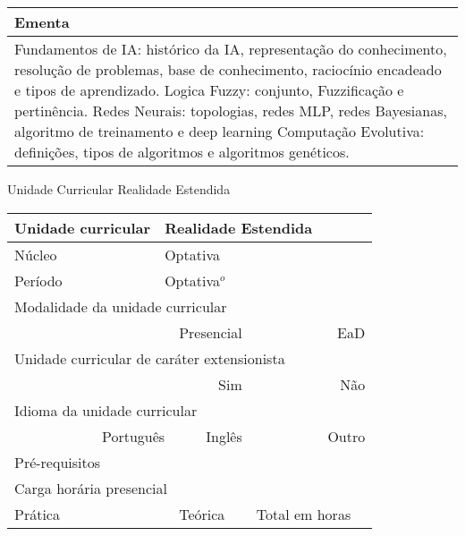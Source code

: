 \begin{quadro}[ht!]
\begin{tabular}{|p{3cm} p{2cm} p{3cm} p{2cm} p{3cm} p{2cm}|}
\multicolumn{6}{|p{15cm}|}{\cellcolor{blue1} Ementa} \\\hline
\hline\multicolumn{6}{|p{15cm}|}{\scriptsize Fundamentos de IA: histórico da IA, representação do conhecimento, resolução de problemas, base de conhecimento, raciocínio encadeado e tipos de aprendizado. Logica Fuzzy: conjunto, Fuzzificação e pertinência. Redes Neurais: topologias, redes MLP, redes Bayesianas, algoritmo de treinamento e deep learning Computação Evolutiva: definições, tipos de algoritmos e algoritmos genéticos.}\\\hline 
\hline
	\end{tabular}
\end{quadro}


\begin{quadro}[ht!]
  \centering\scriptsize
\caption{Unidade Curricular Realidade Estendida}
\begin{tabular}{|p{3cm} p{2cm} p{3cm} p{2cm} p{3cm} p{2cm}|}\hline
\multicolumn{1}{|p{3cm}|}{\cellcolor{blue1} Unidade curricular} & \multicolumn{5}{p{9cm}|}{Realidade Estendida}\\\hline
\multicolumn{1}{|p{3cm}|}{\cellcolor{blue1} Núcleo} & \multicolumn{5}{p{11.5cm}|}{Optativa}\\\hline
\multicolumn{1}{|p{3cm}|}{\cellcolor{blue1} Período} & \multicolumn{5}{p{9cm}|}{Optativa$^o$}\\\hline
\multicolumn{6}{|p{15cm}|}{\cellcolor{blue1} Modalidade da unidade curricular} \\\hline
\multicolumn{2}{|r}{		} &  \multicolumn{2}{r}{Presencial \Square} & \multicolumn{2}{r|}{EaD \XBox	} \\\hline
\multicolumn{6}{|p{15cm}|}{\cellcolor{blue1} Unidade curricular de caráter extensionista} \\\hline
\multicolumn{4}{|r}{			Sim \XBox	} & \multicolumn{2}{r|}{	Não \Square	}\\\hline
\multicolumn{6}{|p{15cm}|}{\cellcolor{blue1} Idioma da unidade curricular} \\ \hline
\multicolumn{2}{|r}{	Português \XBox	} &  \multicolumn{2}{r}{	Inglês \Square	} & \multicolumn{2}{r|}{	Outro \Square	} \\ \hline
\multicolumn{1}{|p{3cm}|}{\cellcolor{blue1} Pré-requisitos} & \multicolumn{5}{p{9cm}|}{}\\ \hline
\multicolumn{6}{|p{15cm}|}{\cellcolor{blue1} Carga horária presencial} \\ \hline
\multicolumn{1}{|p{3cm}|}{\raggedleft Prática} & \multicolumn{1}{p{1cm}|}{\centering	30	} &  \multicolumn{1}{p{3cm}|}{\raggedleft Teórica}  & \multicolumn{1}{p{1cm}|}{\centering 	30	} & \multicolumn{1}{p{3cm}|}{\raggedleft Total em horas} & \multicolumn{1}{p{1cm}|}{\raggedleft	60	} \\ \hline 

\end{tabular}
\end{quadro}
